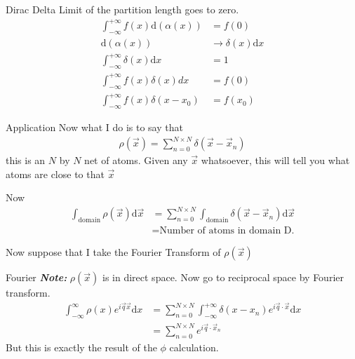 \documentclass{article}
\renewcommand{\d}[0]{\mathrm{d}}
\newcommand{\note}[1]{\vspace{3\parsep}\textit{\textbf{Note: }}#1\vspace{2\parsep}}
\newcommand{\xsubn}[0]{\vec{x}_n}
\newcommand{\xvec}[0]{\vec{x}}
\begin{document}
\begin{section}{}
\begin{subsection}{Dirac Delta}
Limit of the partition length goes to zero.
\begin{align*}
			\int_{-\infty}^{+\infty}f(x)\d(\alpha(x)) &= f(0)\\
			\d(\alpha(x))&\rightarrow \delta(x) \d x\\
			\int_{-\infty}^{+\infty}\delta(x)\d x &= 1\\
			\int_{-\infty}^{+\infty} f(x)\delta(x) dx &= f(0)\\
			\int_{-\infty}^{+\infty}f(x)\delta(x-x_0) &= f(x_0)
\end{align*}

\end{subsection}
\begin{subsection}{Application}
Now what I do is to say that
\begin{align*}
	\rho(\vec{x}) = \sum_{n=0}^{N\times N}\delta(\vec{x}-\vec{x}_n)
\end{align*}
this is an $N$ by $N$ net of atoms. Given any $\vec{x}$ whatsoever, this will tell you what atoms are close to that $\vec{x}$

Now 
\begin{align*}
	\int_{\text{domain}}\rho(\vec{x}) \d\vec{x} &= \sum_{n=0}^{N\times N}\int_{\text{domain}}\delta(\vec{x}-\vec{x}_n)\d \vec{x}\\
	&= \text{Number of atoms in domain D.}
\end{align*}

Now suppose that I take the Fourier Transform of $\rho(\vec{x})$
\end{subsection}
\begin{subsection}{Fourier}
	\note{$\rho(\vec{x})$ is in direct space. Now go to reciprocal space by Fourier transform.}
	\begin{align*}
		\int_{-\infty}^{\infty}\rho(x)e^{i\vec{q}\xvec}\d x &= \sum_{n=0}^{N\times N}\int_{-\infty}^{+\infty}\delta(x-x_n)e^{i\vec{q}\cdot \xvec}\d x\\
		&= \sum_{n=0}^{N\times N}e^{i\vec{q}\cdot\xsubn}
	\end{align*}
	But this is exactly the result of the $\phi$ calculation.
\end{subsection}
\end{section}
\end{document}
